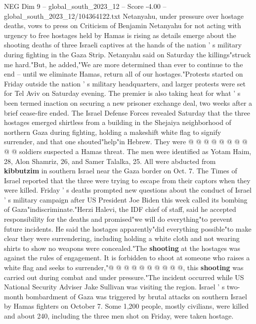 \begin{textsample}{NEG Dim 9 – global\_south\_2023\_12 – Score -4.00 – global\_south\_2023\_12/104364122.txt}  \label{ex:f9_neg_310}
Netanyahu, under pressure over hostage deaths, vows to press on Criticism of Benjamin Netanyahu for not acting with urgency to free hostages held by Hamas is rising as details emerge about the shooting deaths of three Israeli captives at the hands of the nation ' s military during fighting in the Gaza Strip.
Netanyahu said on Saturday the killings"struck me hard."But, he added,"We are more determined than ever to continue to the end -- until we eliminate Hamas, return all of our hostages."Protests started on Friday outside the nation ' s military headquarters, and larger protests were set for Tel Aviv on Saturday evening.
The premier is also taking heat for what ' s been termed inaction on securing a new prisoner exchange deal, two weeks after a brief cease-fire ended.
The Israel Defense Forces revealed Saturday that the three hostages emerged shirtless from a building in the Shejaiya neighborhood of northern Gaza during fighting, holding a makeshift white flag to signify surrender, and that one shouted"help"in Hebrew.
They were @ @ @ @ @ @ @ @ @ @ soldiers suspected a Hamas threat.
The men were identified as Yotam Haim, 28, Alon Shamriz, 26, and Samer Talalka, 25.
All were abducted from \textbf{kibbutzim} in southern Israel near the Gaza border on Oct. 7.
The Times of Israel reported that the three were trying to escape from their captors when they were killed.
Friday ' s deaths prompted new questions about the conduct of Israel ' s military campaign after US President Joe Biden this week called its bombing of Gaza"indiscriminate."Herzi Halevi, the IDF chief of staff, said he accepted responsibility for the deaths and promised"we will do everything"to prevent future incidents.
He said the hostages apparently"did everything possible"to make clear they were surrendering, including holding a white cloth and not wearing shirts to show no weapons were concealed."The \textbf{shooting} at the hostages was against the rules of engagement.
It is forbidden to shoot at someone who raises a white flag and seeks to surrender,"@ @ @ @ @ @ @ @ @ @, this \textbf{shooting} was carried out during combat and under pressure."The incident occurred while US National Security Adviser Jake Sullivan was visiting the region.
Israel ' s two-month bombardment of Gaza was triggered by brutal attacks on southern Israel by Hamas fighters on October 7.
Some 1,200 people, mostly civilians, were killed and about 240, including the three men shot on Friday, were taken hostage.

\end{textsample}
